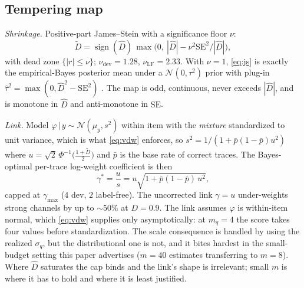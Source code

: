 \documentclass{article}
\newcommand{\Dhat}{\widehat{D}}
\newcommand{\sign}{\operatorname{sign}}
\begin{document}
\subsection{Tempering map}
\emph{Shrinkage.} Positive-part James--Stein with a significance floor $\nu$:
\begin{equation}\label{eq:js}
\tilde D=\sign(\Dhat)\,\max\!\big(0,\ |\Dhat|-\nu^2\mathrm{SE}^2/|\Dhat|\big),
\end{equation}
with dead zone $\{|r|\le\nu\}$; $\nu_{\mathrm{dev}}=1.28$, $\nu_{\mathrm{LF}}=2.33$. With $\nu=1$, \eqref{eq:js} is exactly the empirical-Bayes posterior mean under a $\mathcal{N}(0,\tau^2)$ prior with plug-in $\hat\tau^2=\max(0,\Dhat^2-\mathrm{SE}^2)$ \citep{james1961estimation}. The map is odd, continuous, never exceeds $|\Dhat|$, and is monotone in $\Dhat$ and anti-monotone in $\mathrm{SE}$.

\emph{Link.} Model $\varphi\,|\,y\sim\mathcal{N}(\mu_y,s^2)$ within item with the \emph{mixture} standardized to unit variance, which is what \eqref{eq:vdw} enforces, so $s^2=1/(1+\bar p(1-\bar p)u^2)$ where $u=\sqrt2\,\Phi^{-1}\!\big(\tfrac{1+\tilde D}{2}\big)$ and $\bar p$ is the base rate of correct traces. The Bayes-optimal per-trace log-weight coefficient is then
\begin{equation}\label{eq:link}
\gamma^\ast=\frac{u}{s}=u\sqrt{1+\bar p(1-\bar p)\,u^2},
\end{equation}
capped at $\gamma_{\max}$ ($4$ dev, $2$ label-free). The uncorrected link $\gamma=u$ under-weights strong channels by up to ${\sim}50\%$ at $D=0.9$. The link assumes $\varphi$ is within-item normal, which \eqref{eq:vdw} supplies only asymptotically: at $m_q{=}4$ the score takes four values before standardization. The scale consequence is handled by using the realized $\sigma_q$, but the distributional one is not, and it bites hardest in the small-budget setting this paper advertises ($m{=}40$ estimates transferring to $m{=}8$). Where $\Dhat$ saturates the cap binds and the link's shape is irrelevant; small $m$ is where it has to hold and where it is least justified.
\end{document}
